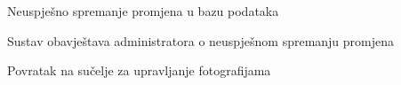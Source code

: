 \begin{packed_item}
\begin{packed_item}
\begin{packed_enum}
							\end{packed_enum}
							
							\item[4.a] Neuspješno spremanje promjena u bazu podataka
							\item[] \begin{packed_enum}
								
								\item Sustav obavještava administratora o neuspješnom spremanju promjena
								\item Povratak na sučelje za upravljanje fotografijama
							
							\end{packed_enum}
							
						\end{packed_item}
					\end{packed_item}
					
